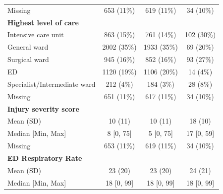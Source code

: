 \documentclass[12pt, a4paper]{article}
\begin{document}
\begin{table}[p]
{\begin{tabular}{lccc}
			\hspace{3mm}Missing                           & 653 (11\%)        & 619 (11\%)        & 34 (10\%)        \\
			\textbf{Highest level of care}                &                   &                   &                  \\
			\hspace{3mm}Intensive care unit               & 863 (15\%)        & 761 (14\%)        & 102 (30\%)       \\
			\hspace{3mm}General ward                      & 2002 (35\%)       & 1933 (35\%)       & 69 (20\%)        \\
			\hspace{3mm}Surgical ward                     & 945 (16\%)        & 852 (16\%)        & 93 (27\%)        \\
			\hspace{3mm}ED                                & 1120 (19\%)       & 1106 (20\%)       & 14 (4\%)         \\
			\hspace{3mm}Specialist/Intermediate ward      & 212 (4\%)         & 184 (3\%)         & 28 (8\%)         \\
			\hspace{3mm}Missing                           & 651 (11\%)        & 617 (11\%)        & 34 (10\%)        \\
			\textbf{Injury severity score}                &                   &                   &                  \\
			\hspace{3mm}Mean (SD)                         & 10 (11)           & 10 (11)           & 18 (10)          \\
			\hspace{3mm}Median [Min, Max]                 & 8 [0, 75]         & 5 [0, 75]         & 17 [0, 59]       \\
			\hspace{3mm}Missing                           & 653 (11\%)        & 619 (11\%)        & 34 (10\%)        \\
			\textbf{ED Respiratory Rate}                  &                   &                   &                  \\
			\hspace{3mm}Mean (SD)                         & 23 (20)           & 23 (20)           & 24 (21)          \\
			\hspace{3mm}Median [Min, Max]                 & 18 [0, 99]        & 18 [0, 99]        & 18 [0, 99]       \\

\end{tabular}}
\end{table}
\end{document}
